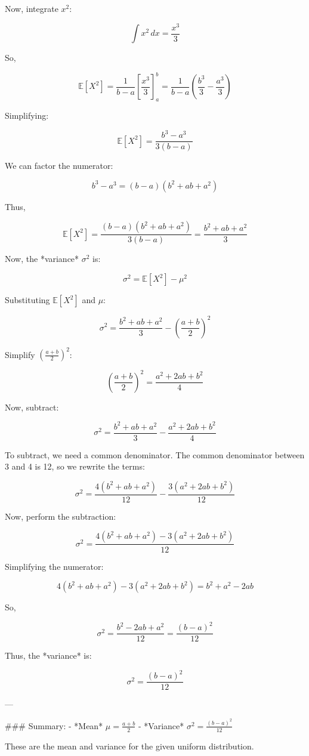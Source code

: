 Now, integrate \( x^2 \):

\[
\int x^2 \, dx = \frac{x^3}{3}
\]

So,

\[
\mathbb{E}[X^2] = \frac{1}{b - a} \left[ \frac{x^3}{3} \right]_a^b = \frac{1}{b - a} \left( \frac{b^3}{3} - \frac{a^3}{3} \right)
\]

Simplifying:

\[
\mathbb{E}[X^2] = \frac{b^3 - a^3}{3(b - a)}
\]

We can factor the numerator:

\[
b^3 - a^3 = (b - a)(b^2 + ab + a^2)
\]

Thus,

\[
\mathbb{E}[X^2] = \frac{(b - a)(b^2 + ab + a^2)}{3(b - a)} = \frac{b^2 + ab + a^2}{3}
\]

Now, the *variance* \( \sigma^2 \) is:

\[
\sigma^2 = \mathbb{E}[X^2] - \mu^2
\]

Substituting \( \mathbb{E}[X^2] \) and \( \mu \):

\[
\sigma^2 = \frac{b^2 + ab + a^2}{3} - \left( \frac{a + b}{2} \right)^2
\]

Simplify \( \left( \frac{a + b}{2} \right)^2 \):

\[
\left( \frac{a + b}{2} \right)^2 = \frac{a^2 + 2ab + b^2}{4}
\]

Now, subtract:

\[
\sigma^2 = \frac{b^2 + ab + a^2}{3} - \frac{a^2 + 2ab + b^2}{4}
\]

To subtract, we need a common denominator. The common denominator between 3 and 4 is 12, so we rewrite the terms:

\[
\sigma^2 = \frac{4(b^2 + ab + a^2)}{12} - \frac{3(a^2 + 2ab + b^2)}{12}
\]

Now, perform the subtraction:

\[
\sigma^2 = \frac{4(b^2 + ab + a^2) - 3(a^2 + 2ab + b^2)}{12}
\]

Simplifying the numerator:

\[
4(b^2 + ab + a^2) - 3(a^2 + 2ab + b^2) = b^2 + a^2 - 2ab
\]

So,

\[
\sigma^2 = \frac{b^2 - 2ab + a^2}{12} = \frac{(b - a)^2}{12}
\]

Thus, the *variance* is:

\[
\sigma^2 = \frac{(b - a)^2}{12}
\]

---

### Summary:
- *Mean* \( \mu = \frac{a + b}{2} \)
- *Variance* \( \sigma^2 = \frac{(b - a)^2}{12} \)

These are the mean and variance for the given uniform distribution.

